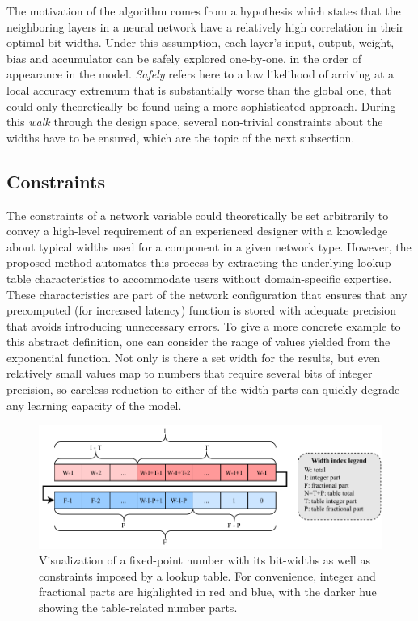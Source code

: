 The motivation of the algorithm comes from a hypothesis which states that the neighboring layers in a neural network have a relatively high correlation in their optimal bit-widths. Under this assumption, each layer's input, output, weight, bias and accumulator can be safely explored one-by-one, in the order of appearance in the model. \textit{Safely} refers here to a low likelihood of arriving at a local accuracy extremum that is substantially worse than the global one, that could only theoretically be found using a more sophisticated approach. During this \textit{walk} through the design space, several non-trivial constraints about the widths have to be ensured, which are the topic of the next subsection.



\subsection{Constraints}
The constraints of a network variable could theoretically be set arbitrarily to convey a high-level requirement of an experienced designer with a knowledge about typical widths used for a component in a given network type. However, the proposed method automates this process by extracting the underlying lookup table characteristics to accommodate users without domain-specific expertise. These characteristics are part of the network configuration that ensures that any precomputed (for increased latency) function is stored with adequate precision that avoids introducing unnecessary errors. To give a more concrete example to this abstract definition, one can consider the range of values yielded from the exponential function. Not only is there a set width for the results, but even relatively small values map to numbers that require several bits of integer precision, so careless reduction to either of the width parts can quickly degrade any learning capacity of the model.

\begin{figure}[hpt!]
  \centering
  \includegraphics[trim={0cm 0cm 0cm 0cm}, width=1.0\textwidth, center]{quantization/width_constraints.pdf}
  \caption{Visualization of a fixed-point number with its bit-widths as well as constraints imposed by a lookup table. For convenience, integer and fractional parts are highlighted in red and blue, with the darker hue showing the table-related number parts.}
  \label{fig:width-constraints}
\end{figure}

